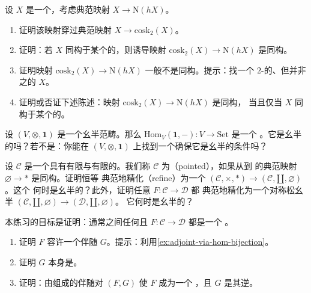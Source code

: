 \begin{exercise}\label{ex:cosk2-vs-nerve-hx}
设 $X$ 是一个\trSimplicialSet{}，考虑典范映射 $X \to \mathrm{N}(hX)$。
\begin{enumerate}[label=(\arabic*)]
  \item 证明该映射穿过典范映射 $X \to \mathrm{cosk}_2(X)$。
  \item 证明：若 $X$ 同构于某个\trCategory{}的\trNerve{}，则诱导映射
        $\mathrm{cosk}_2(X) \to \mathrm{N}(hX)$ 是同构。
  \item 证明映射 $\mathrm{cosk}_2(X) \to \mathrm{N}(hX)$ 一般不是同构。提示：找一个
        $2$-\trCoskeleton{}的、但并非\trCategory{}之\trNerve{}的 $X$。
  \item 证明或否证下述陈述：映射 $\mathrm{cosk}_2(X) \to \mathrm{N}(hX)$ 是同构，
        当且仅当 $X$ 同构于某个\trCategory{}的\trNerve{}。
\end{enumerate}
\end{exercise}

\begin{exercise}\label{ex:hom-v-lax-monoidal}
设 $(V, \otimes, \mathbf{1})$ 是一个幺半范畴。那么\trFunctor{}%
$\mathrm{Hom}_V(\mathbf{1}, -)\colon V \to \mathrm{Set}$ 是一个%
\trLaxMonoidalFunctor{}。它是幺半的吗？若不是：你能在 $(V, \otimes, \mathbf{1})$
上找到一个确保它是幺半的条件吗？
\end{exercise}

\begin{exercise}\label{ex:pointed-lax-monoidal}
设 $\mathcal{C}$ 是一个具有有限\trProduct{}与有限\trCoproduct{}的\trCategory{}。我们称
$\mathcal{C}$ 为\emph{\trPointed{}}（pointed），如果从\trInitialObject{}到%
\trTerminalObject{}的典范映射 $\varnothing \to \ast$ 是同构。证明恒等\trFunctor{}%
典范地精化（refine）为一个\trLaxMonoidalFunctor{}%
$(\mathcal{C}, \times, \ast) \to (\mathcal{C}, \amalg, \varnothing)$。这个\trFunctor{}%
何时是幺半的？此外，证明任意\trFunctor{} $F\colon \mathcal{C} \to \mathcal{D}$ 都
典范地精化为一个对称松幺半\trFunctor{}%
$(\mathcal{C}, \amalg, \varnothing) \to (\mathcal{D}, \amalg, \varnothing)$。
它何时是幺半的？
\end{exercise}

\begin{exercise}\label{ex:essentially-surjective-fully-faithful-equivalence}
本练习的目标是证明：通常\trCategories{}之间任何\trEssentiallySurjective{}且%
\trFullyFaithful{}\trFunctor{} $F\colon \mathcal{C} \to \mathcal{D}$ 都是一个%
\trEquivalence{}。
\begin{enumerate}[label=(\arabic*)]
  \item 证明 $F$ 容许一个伴随 $G$。提示：利用\cref{ex:adjoint-via-hom-bijection}。
  \item 证明 $G$ 本身是\trFullyFaithful{}。
  \item 证明：由\trFullyFaithful{}\trFunctor{}组成的伴随对 $(F, G)$ 使 $F$ 成为一个%
        \trEquivalence{}，且 $G$ 是其逆。
\end{enumerate}
\end{exercise}

